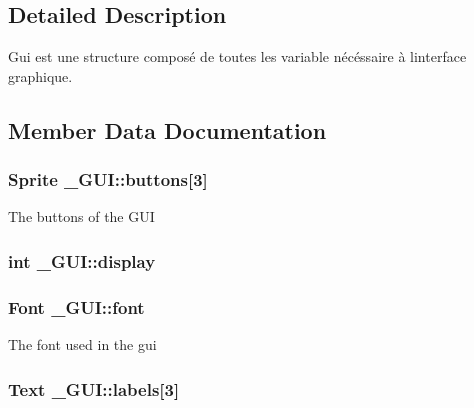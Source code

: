 \subsection{Detailed Description}
Gui est une structure composé de toutes les variable nécéssaire à linterface graphique. 

\subsection{Member Data Documentation}
\subsubsection[{\texorpdfstring{buttons}{buttons}}]{\setlength{\rightskip}{0pt plus 5cm}Sprite \+\_\+\+G\+U\+I\+::buttons\mbox{[}3\mbox{]}}\hypertarget{struct___g_u_i_a3ad6a016469abb960aca20f8dfa8ef30}{}\label{struct___g_u_i_a3ad6a016469abb960aca20f8dfa8ef30}
The buttons of the G\+UI 
\subsubsection[{\texorpdfstring{display}{display}}]{\setlength{\rightskip}{0pt plus 5cm}int \+\_\+\+G\+U\+I\+::display}\hypertarget{struct___g_u_i_a8c72fa2b601a788e3e182eb2f88c8787}{}\label{struct___g_u_i_a8c72fa2b601a788e3e182eb2f88c8787}
\subsubsection[{\texorpdfstring{font}{font}}]{\setlength{\rightskip}{0pt plus 5cm}Font \+\_\+\+G\+U\+I\+::font}\hypertarget{struct___g_u_i_a57e7251e818576e9b17dd162f680d535}{}\label{struct___g_u_i_a57e7251e818576e9b17dd162f680d535}
The font used in the gui 
\subsubsection[{\texorpdfstring{labels}{labels}}]{\setlength{\rightskip}{0pt plus 5cm}Text \+\_\+\+G\+U\+I\+::labels\mbox{[}3\mbox{]}}\hypertarget{struct___g_u_i_a9eb208efe8d282d8e894d1a470913091}{}\label{struct___g_u_i_a9eb208efe8d282d8e894d1a470913091}
